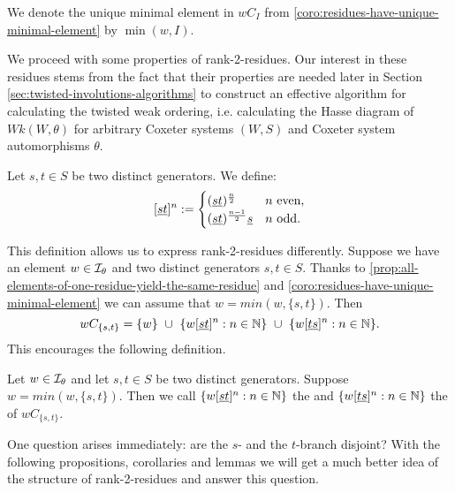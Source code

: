 \begin{defi}
	We denote the unique minimal element in $wC_I$ from \ref{coro:residues-have-unique-minimal-element} by $\min(w,I)$.
\end{defi}

We proceed with some properties of rank-2-residues. Our interest in these residues stems from the fact that their properties are needed later in Section \ref{sec:twisted-involutions-algorithms} to construct an effective algorithm for calculating the twisted weak ordering, i.e. calculating the Hasse diagram of $Wk(W,\theta)$ for arbitrary Coxeter systems $(W,S)$ and Coxeter system automorphisms $\theta$.

\begin{defi}
	Let $s,t \in S$ be two distinct generators. We define:
	$$[\underline{s} \underline{t}]^n :=
	\begin{cases}
	(\underline{s} \underline{t})^{\frac{n}{2}} & n \textrm{ even}, \\
	(\underline{s} \underline{t})^{\frac{n-1}{2}} \underline{s} & n \textrm{ odd}. 
	\end{cases}$$
\end{defi}

This definition allows us to express rank-2-residues differently. Suppose we have an element $w \in \mathcal{I}_{\theta}$ and two distinct generators $s,t \in S$. Thanks to \ref{prop:all-elements-of-one-residue-yield-the-same-residue} and \ref{coro:residues-have-unique-minimal-element} we can assume that $w = min(w,\{s,t\})$. Then
$$ wC_{\{s,t\}} = \{ w \} \ \cup \ \{ w [\underline{s} \underline{t}]^n : n \in \mathbb{N} \} \ \cup \ \{ w [\underline{t} \underline{s}]^n : n \in \mathbb{N} \}. $$
This encourages the following definition.

\begin{defi}
	Let $w \in \mathcal{I}_{\theta}$ and let $s,t \in S$ be two distinct generators. Suppose $w = min(w,\{s,t\})$. Then we call $\{ w [\underline{s} \underline{t}]^n : n \in \mathbb{N} \}$ the  and $\{ w [\underline{t} \underline{s}]^n : n \in \mathbb{N} \}$ the  of $wC_{\{s,t\}}$.
\end{defi}

One question arises immediately: are the $s$- and the $t$-branch disjoint? With the following propositions, corollaries and lemmas we will get a much better idea of the structure of rank-2-residues and answer this question.

